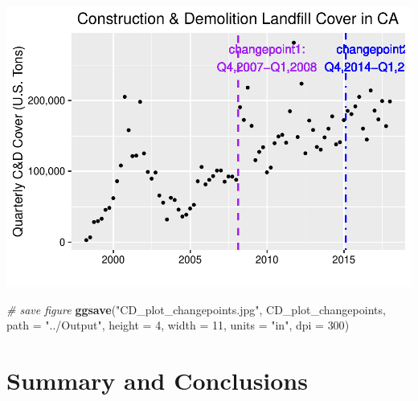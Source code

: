 \documentclass[12pt,]{article}
\newenvironment{Shaded}{\begin{snugshade}}{\end{snugshade}}
\newcommand{\KeywordTok}[1]{\textcolor[rgb]{0.13,0.29,0.53}{\textbf{#1}}}
\newcommand{\DataTypeTok}[1]{\textcolor[rgb]{0.13,0.29,0.53}{#1}}
\newcommand{\DecValTok}[1]{\textcolor[rgb]{0.00,0.00,0.81}{#1}}
\newcommand{\StringTok}[1]{\textcolor[rgb]{0.31,0.60,0.02}{#1}}
\newcommand{\CommentTok}[1]{\textcolor[rgb]{0.56,0.35,0.01}{\textit{#1}}}
\newcommand{\NormalTok}[1]{#1}
\begin{document}
\includegraphics{SKo_Project_Template_files/figure-latex/Test3-4.pdf}

\begin{Shaded}
\begin{Highlighting}[]
\CommentTok{# save figure}
\KeywordTok{ggsave}\NormalTok{(}\StringTok{"CD_plot_changepoints.jpg"}\NormalTok{, CD_plot_changepoints, }\DataTypeTok{path =} \StringTok{"../Output"}\NormalTok{, }\DataTypeTok{height =} \DecValTok{4}\NormalTok{, }\DataTypeTok{width =} \DecValTok{11}\NormalTok{, }\DataTypeTok{units =} \StringTok{"in"}\NormalTok{, }\DataTypeTok{dpi =} \DecValTok{300}\NormalTok{)}
\end{Highlighting}
\end{Shaded}

\newpage

\section{Summary and Conclusions}\label{summary-and-conclusions}
\end{document}

